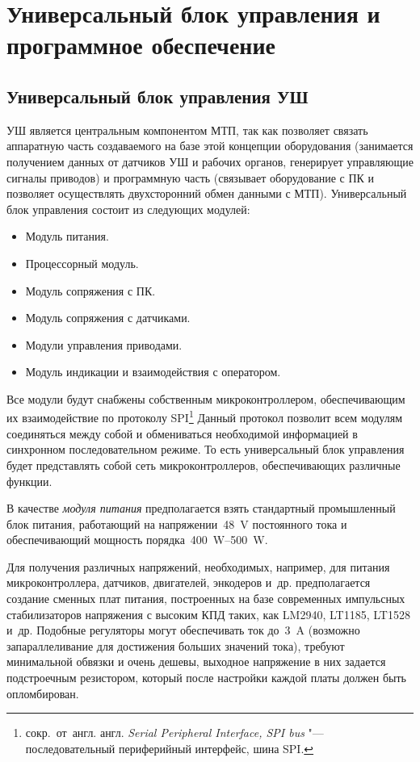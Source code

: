\section{Универсальный блок управления и программное обеспечение}

\subsection{Универсальный блок управления УШ}

УШ является центральным компонентом МТП, так как позволяет связать аппаратную часть создаваемого на базе этой концепции оборудования (занимается получением данных от датчиков УШ и рабочих органов, генерирует управляющие сигналы приводов) и программную часть (связывает оборудование с ПК и позволяет осуществлять двухсторонний обмен данными с МТП). Универсальный блок управления состоит из следующих модулей:

\begin{itemize}
	\item Модуль питания.
	\item Процессорный модуль.
	\item Модуль сопряжения с ПК.
	\item Модуль сопряжения с датчиками.
	\item Модули управления приводами.
	\item Модуль индикации и взаимодействия с оператором.
\end{itemize}

Все модули будут снабжены собственным микроконтроллером, обеспечивающим их взаимодействие по протоколу \foreignlanguage{english}{SPI}\footnote{сокр.~от~англ. англ. \textit{Serial Peripheral Interface, SPI bus} "--- последовательный периферийный интерфейс, шина SPI.} Данный протокол позволит всем модулям соединяться между собой и обмениваться необходимой информацией в синхронном последовательном режиме. То есть универсальный блок управления будет представлять собой сеть микроконтроллеров, обеспечивающих различные функции.

В качестве \textit{модуля питания} предполагается взять стандартный промышленный блок питания, работающий на напряжении~\SI{48}{\volt} постоянного тока и обеспечивающий мощность порядка~\SIrange{400}{500}{\watt}.

Для получения различных напряжений, необходимых, например, для питания микроконтроллера, датчиков, двигателей, энкодеров и~др. предполагается создание сменных плат питания, построенных на базе современных импульсных стабилизаторов напряжения с высоким КПД таких, как LM2940, LT1185, LT1528 и~др. Подобные регуляторы могут обеспечивать ток до~\SI{3}{\ampere} (возможно запараллеливание для достижения больших значений тока), требуют минимальной обвязки и очень дешевы, выходное напряжение в них задается подстроечным резистором, который после настройки каждой платы должен быть опломбирован.

